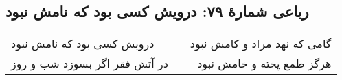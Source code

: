 \begin{center}
\section*{رباعی شمارهٔ ۷۹: درویش کسی بود که نامش نبود}
\label{sec:079}
\begin{longtable}{l p{0.5cm} r}
درویش کسی بود که نامش نبود
&&
گامی که نهد مراد و کامش نبود
\\
در آتش فقر اگر بسوزد شب و روز 
&&
هرگز طمع پخته و خامش نبود
\\
\end{longtable}
\end{center}
